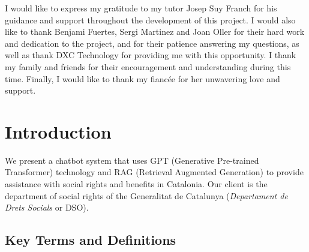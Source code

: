 \documentclass[a4paper,12pt,twoside]{ThesisStyle}
\begin{document}
I would like to express my gratitude to my tutor Josep Suy Franch for his guidance and support throughout the development of this project. I would also like to thank Benjami Fuertes, Sergi Martinez and Joan Oller for their hard work and dedication to the project, and for their patience answering my questions, as well as thank DXC Technology for providing me with this opportunity. I thank my family and friends for their encouragement and understanding during this time.
Finally, I would like to thank my fiancée for her unwavering love and support.


\tableofcontents

\listoffigures

\listoftables

\mainmatter

\chapter{Introduction}
\label{cap:intro}

We present a chatbot system that uses GPT (Generative Pre-trained Transformer) technology and RAG (Retrieval Augmented Generation) to provide assistance with social rights and benefits in Catalonia. Our client is the department of social rights of the Generalitat de Catalunya (\textit{Departament de Drets Socials} or DSO).

\section{Key Terms and Definitions}
\label{sec:terms}
\end{document}
